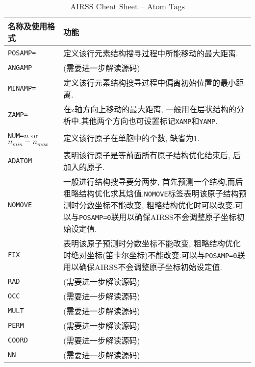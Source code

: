 \documentclass[a4paper, 10pt]{article}
\begin{document}
        \begin{table}
          \centering
          \caption{AIRSS Cheat Sheet -- Atom Tags}
          \label{AIRSS_Atom_Tag}  
          \begin{tabular}{p{13em}|p{19em}}
            \toprule
            名称及使用格式 & 功能\\
            \midrule
            \verb|POSAMP=|& 定义该行元素结构搜寻过程中所能移动的最大距离.\\
            \midrule
            \verb|ANGAMP| & (需要进一步解读源码)\\
            \midrule
            \verb|MINAMP=|& 定义该行元素结构搜寻过程中偏离初始位置的最小距离.\\
            \midrule
            \verb|ZAMP=|&在z轴方向上移动的最大距离, 一般用在层状结构的分析中.其他两个方向也可设置标记\verb|XAMP|和\verb|YAMP|.\\
            \midrule
            \verb|NUM=|\(n\) or \(n_{min}-n_{max}\)&定义该行原子在单胞中的个数, 缺省为1.\\
            \midrule
            \verb|ADATOM| & 表明该行原子是等前面所有原子结构优化结束后, 后加入的原子.\\
            \midrule
            \verb|NOMOVE| & 一般进行结构搜寻要分两步, 首先预测一个结构,而后粗略结构优化求其焓值.\verb|NOMOVE|标签表明该原子结构预测时分数坐标不能改变, 粗略结构优化时可以改变.可以与\verb|POSAMP=0|联用以确保AIRSS不会调整原子坐标初始设定值.\\
            \midrule
            \verb|FIX| & 表明该原子预测时分数坐标不能改变, 粗略结构优化时绝对坐标(笛卡尔坐标)不能改变.可以与\verb|POSAMP=0|联用以确保AIRSS不会调整原子坐标初始设定值.\\
            \midrule
            \verb|RAD| & (需要进一步解读源码)\\
            \midrule
            \verb|OCC| & (需要进一步解读源码)\\
            \midrule
            \verb|MULT| & (需要进一步解读源码)\\
            \midrule
            \verb|PERM| & (需要进一步解读源码)\\
            \midrule
            \verb|COORD| & (需要进一步解读源码)\\
            \midrule
            \verb|NN| & (需要进一步解读源码)\\
            \bottomrule
          \end{tabular}
        \end{table}
\end{document}
